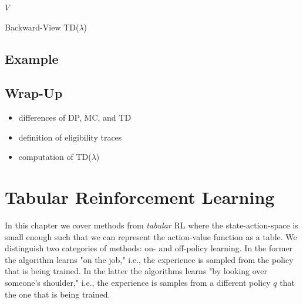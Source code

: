 			\begin{algorithm}  \DontPrintSemicolon
				\Return \(V\) \;
				\caption{Backward-View TD(\(\lambda\))}
				\label{alg:backwardViewTdLambda}
			\end{algorithm}

	\section{Example} %

	\section{Wrap-Up}
		\begin{itemize}
			\item differences of \ac{DP}, \ac{MC}, and \ac{TD}
			\item definition of eligibility traces
			\item computation of TD(\(\lambda\))
		\end{itemize}

\chapter{Tabular Reinforcement Learning}
	In this chapter we cover methods from \emph{tabular} \ac{RL} where the state-action-space is small enough such that we can represent the action-value function as a table. We distinguish two categories of methods: on- and off-policy learning. In the former the algorithm learns "on the job," i.e., the experience is sampled from the policy that is being trained. In the latter the algorithms learns "by looking over someone's shoulder," i.e., the experience is samples from a different policy \(q\) that the one that is being trained.

